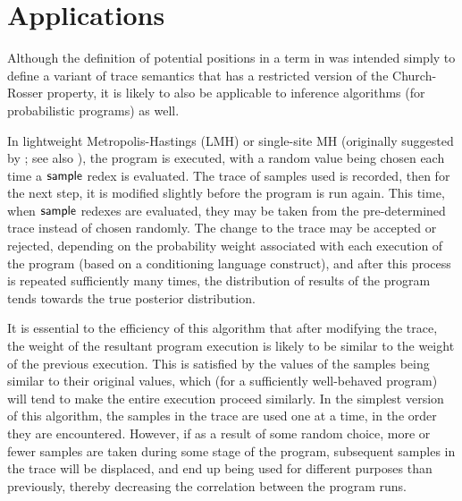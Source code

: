 \section{Applications}
\label{sec:applications}
Although the definition of potential positions in a term in  was intended simply to define a variant of trace semantics that has a restricted version of the Church-Rosser property, it is likely to also be applicable to inference algorithms (for probabilistic programs) as well.


In lightweight Metropolis-Hastings (LMH) or single-site MH (originally suggested by \cite{wingate2011lightweight}; see also \cite{rainforth2017Automating}),
the program is executed, with a random value being chosen each time a $\mathsf{sample}$ redex is evaluated. The trace of samples used is recorded, then for the next step, it is modified slightly before the program is run again. This time, when $\mathsf{sample}$ redexes are evaluated, they may be taken from the pre-determined trace instead of chosen randomly. The change to the trace may be accepted or rejected, depending on the probability weight associated with each execution of the program (based on a conditioning language construct), and after this process is repeated sufficiently many times, the distribution of results of the program tends towards the true posterior distribution.

It is essential to the efficiency of this algorithm that after modifying the trace, the weight of the resultant program execution is likely to be similar to the weight of the previous execution. This is satisfied by the values of the samples being similar to their original values, which (for a sufficiently well-behaved program) will tend to make the entire execution proceed similarly. In the simplest version of this algorithm, the samples in the trace are used one at a time, in the order they are encountered. However, if as a result of some random choice, more or fewer samples are taken during some stage of the program, subsequent samples in the trace will be displaced, and end up being used for different purposes than previously, thereby decreasing the correlation between the program runs.

